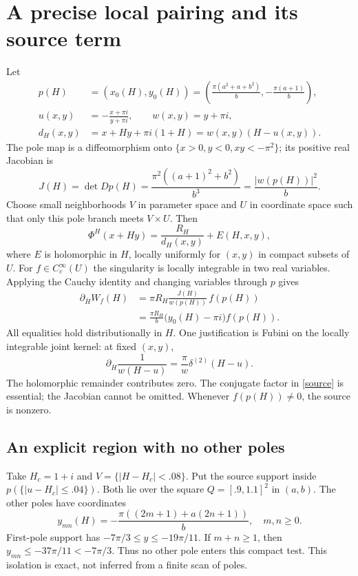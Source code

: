\documentclass[11pt,a4paper]{article}
\newcommand{\db}{\partial_{\overline H}}
\begin{document}
\section{A precise local pairing and its source term}
Let
\begin{align}
 p(H)&=(x_0(H),y_0(H))
 =\left(\frac{\pi(a^2+a+b^2)}b,-\frac{\pi(a+1)}b\right),\\
 u(x,y)&=-\frac{x+\pi i}{y+\pi i},\qquad
 w(x,y)=y+\pi i,\\
 d_H(x,y)&=x+Hy+\pi i(1+H)=w(x,y)(H-u(x,y)).
\end{align}
The pole map is a diffeomorphism onto
$\{x>0,y<0,xy<-\pi^2\}$; its positive real Jacobian is
\[
 J(H)=\det Dp(H)=\frac{\pi^2((a+1)^2+b^2)}{b^3}
             =\frac{|w(p(H))|^2}{b}.
\]
Choose small neighborhoods $V$ in parameter space and $U$ in coordinate
space such that only this pole branch meets $V\times U$.
Then
\[
 \Phi^H(x+Hy)=\frac{R_H}{d_H(x,y)}+E(H,x,y),
\]
where $E$ is holomorphic in $H$, locally uniformly for $(x,y)$ in
compact subsets of $U$. For $f\in C_c^\infty(U)$ the singularity is
locally integrable in two real variables. Applying the Cauchy identity
and changing variables through $p$ gives
\begin{align}
 \db W_f(H)
 &=\pi R_H\frac{J(H)}{w(p(H))}\,f(p(H))\\
 &=\frac{\pi R_H}{b}
       \bigl(y_0(H)-\pi i\bigr)f(p(H)).
 \label{source}
\end{align}
All equalities hold distributionally in $H$. One justification is
Fubini on the locally integrable joint kernel: at fixed $(x,y)$,
\[
 \db\frac{1}{w(H-u)}=\frac{\pi}{w}\delta^{(2)}(H-u).
\]
The holomorphic remainder contributes zero. The conjugate factor in
\eqref{source} is essential; the Jacobian cannot be omitted.
Whenever $f(p(H))\ne0$, the source is nonzero.

\subsection*{An explicit region with no other poles}
Take $H_c=1+i$ and $V=\{|H-H_c|<.08\}$. Put the source support
inside $p(\{|u-H_c|\leq.04\})$. Both lie over the square
$Q=[.9,1.1]^2$ in $(a,b)$.
The other poles have coordinates
\[
 y_{mn}(H)=-\frac{\pi((2m+1)+a(2n+1))}{b},\quad m,n\geq0 .
\]
First-pole support has
$-7\pi/3\leq y\leq-19\pi/11$.
If $m+n\geq1$, then $y_{mn}\leq-37\pi/11<-7\pi/3$.
Thus no other pole enters this compact test. This isolation is exact,
not inferred from a finite scan of poles.
\end{document}
